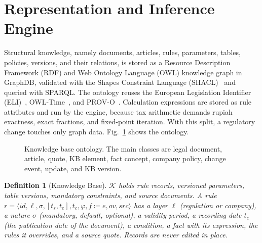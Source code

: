 \documentclass[conference]{IEEEtran}
\newtheorem{definition}{Definition}
\newcommand{\K}{\mathcal{K}}
\begin{document}
\section{Representation and Inference Engine}
\label{sec:representasi}
Structural knowledge, namely documents, articles, rules, parameters, tables, policies, versions, and their relations, is stored as a Resource Description Framework (RDF) and Web Ontology Language (OWL) knowledge graph in GraphDB, validated with the Shapes Constraint Language (SHACL)~\cite{knublauch2017shacl} and queried with SPARQL. The ontology reuses the European Legislation Identifier (ELI)~\cite{publicationsoffice2026elien}, OWL-Time~\cite{cox2017owltime}, and PROV-O~\cite{lebo2013provo}. Calculation expressions are stored as rule attributes and run by the engine, because tax arithmetic demands rupiah exactness, exact fractions, and fixed-point iteration. With this split, a regulatory change touches only graph data. Fig.~\ref{fig:ontologi} shows the ontology.

\begin{figure}[t]
\centering
\newcommand{\ontologicatatan}{Every pph:KBElement: elementId, seq, recordedOn ($\approx$ prov:generatedAtTime), validFrom, validUntil ($\approx$ time:ProperInterval);\\
   one named graph kb:update/\textit{id} per update. pph:Rule: layer $\in$ \{Regulation, Company\}, modality $\in$ \{Mandatory, Default, Optional\},\\
   scope $\in$ \{Period, Year\}, expression, condition, fixed point, policy.}

\caption{Knowledge base ontology. The main classes are legal document, article, quote, KB element, fact concept, company policy, change event, update, and KB version.}
\label{fig:ontologi}
\end{figure}

\begin{definition}[Knowledge Base]
\label{def:kb}
$\K$ holds rule records, versioned parameters, table versions, mandatory constraints, and source documents. A rule $r = \langle \mathit{id}, \ell, \sigma, [t_s, t_e], t_c, \varphi, f \coloneqq e, \mathit{ov}, \mathit{src} \rangle$ has a layer $\ell$ (regulation or company), a nature $\sigma$ (mandatory, default, optional), a validity period, a recording date $t_c$ (the publication date of the document), a condition, a fact with its expression, the rules it overrides, and a source quote. Records are never edited in place.
\end{definition}
\end{document}
